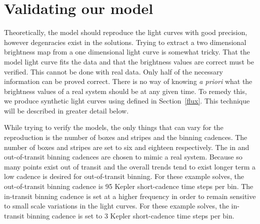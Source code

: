 

\section{Validating our model \label{validation}}
Theoretically, the model should reproduce the light curves with good precision, however degenracies exist in the solutions. Trying to extract a two dimensional brightness map from a one dimensional light curve is somewhat tricky.  That the model light curve fits the data and that the brightness values are correct must be verified. This cannot be done with real data. Only half of the necessary information can be proved correct. There is no way of knowing {\it a priori} what the brightness values of a real system should be at any given time. To remedy this, we produce synthetic light curves using \fmod   defined in Section~\ref{flux}. This technique will be described in greater detail below. 

While trying to verify the models, the only things that can vary for the reproduction is the number of boxes and stripes and the binning cadences. The number of boxes and stripes are set to six and eighteen respectively.  The in and out-of-transit binning cadences are chosen to mimic a real system. Because so many points exist out of transit and the overall trends tend to exist longer term a low cadence is desired for out-of-transit binning. For these example solves, the out-of-transit binning cadence is 95 Kepler short-cadence time steps per bin. The in-transit binning cadence is set at a higher frequency in order to remain sensitive to small scale variations in the light curves. For these example solves, the in-transit binning cadence is set to 3 Kepler short-cadence time steps per bin.